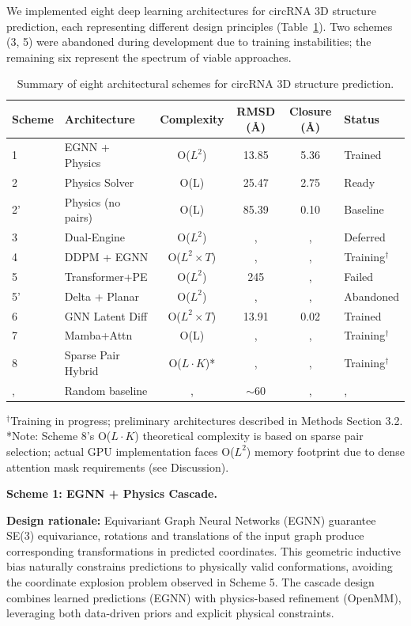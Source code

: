 \documentclass[12pt]{article}
\begin{document}
We implemented eight deep learning architectures for circRNA 3D structure prediction, each representing different design principles (Table~\ref{tab:schemes}). Two schemes (3, 5) were abandoned during development due to training instabilities; the remaining six represent the spectrum of viable approaches.

\begin{table}[htbp]
\centering
\caption{Summary of eight architectural schemes for circRNA 3D structure prediction.}
\label{tab:schemes}
\begin{tabular}{llcccl}
\toprule
Scheme & Architecture & Complexity & RMSD (\AA) & Closure (\AA) & Status \\
\midrule
1 & EGNN + Physics & O($L^2$) & 13.85 & 5.36 & Trained \\
2 & Physics Solver & O(L) & 25.47 & 2.75 & Ready \\
2' & Physics (no pairs) & O(L) & 85.39 & 0.10 & Baseline \\
3 & Dual-Engine & O($L^2$) & , & , & Deferred \\
4 & DDPM + EGNN & O($L^2 \times T$) & , & , & Training$^{\dagger}$ \\
5 & Transformer+PE & O($L^2$) & 245 & , & Failed \\
5' & Delta + Planar & O($L^2$) & , & , & Abandoned \\
6 & GNN Latent Diff & O($L^2 \times T$) & 13.91 & 0.02 & Trained \\
7 & Mamba+Attn & O(L) & , & , & Training$^{\dagger}$ \\
8 & Sparse Pair Hybrid & O($L \cdot K$)* & , & , & Training$^{\dagger}$ \\
\midrule
, & Random baseline & , & $\sim$60 & , & , \\
\bottomrule
\end{tabular}
\footnotesize
$^{\dagger}$Training in progress; preliminary architectures described in Methods Section 3.2.\\
*Note: Scheme 8's O($L \cdot K$) theoretical complexity is based on sparse pair selection; actual GPU implementation faces O($L^2$) memory footprint due to dense attention mask requirements (see Discussion).
\end{table}

\textbf{Scheme 1: EGNN + Physics Cascade.}

\textbf{Design rationale:} Equivariant Graph Neural Networks (EGNN) \citep{satorras2021} guarantee SE(3) equivariance, rotations and translations of the input graph produce corresponding transformations in predicted coordinates. This geometric inductive bias naturally constrains predictions to physically valid conformations, avoiding the coordinate explosion problem observed in Scheme 5. The cascade design combines learned predictions (EGNN) with physics-based refinement (OpenMM), leveraging both data-driven priors and explicit physical constraints.
\end{document}
